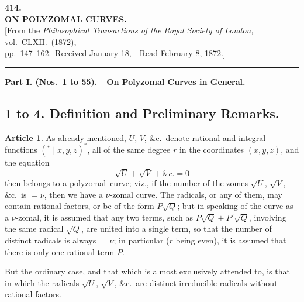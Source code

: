 \documentclass[11pt,a4paper]{article}
\theoremstyle{definition}
\newtheorem{art}{Article}
\newcommand{\polyzomal}{polyzomal}
\begin{document}
\thispagestyle{empty}
\begin{center}
{\Large\bfseries 414.}\\[1em]
{\LARGE\bfseries ON POLYZOMAL CURVES.}\\[2em]
{\normalsize [From the \textit{Philosophical Transactions of the Royal Society of London,} vol.\ CLXII.\ (1872),\\pp.~147--162.\ Received January 18,---Read February 8, 1872.]}\\[2em]
\rule{0.5\textwidth}{0.4pt}
\end{center}

\vspace{1em}

\begin{center}
\textbf{Part I. (Nos.\ 1 to 55).---On Polyzomal Curves in General.}
\end{center}

\vspace{0.5em}

\subsection*{1 to 4. Definition and Preliminary Remarks.}

\begin{art}
As already mentioned, $U$, $V$, \&c.\ denote rational and integral functions $({}^{*}\!\!\mid\! x, y, z)^{r}$, all of the same degree $r$ in the coordinates $(x, y, z)$, and the equation
\[
\sqrt{U} + \sqrt{V} + \&c. = 0
\]
then belongs to a \polyzomal\ curve; viz., if the number of the zomes $\sqrt{U}$, $\sqrt{V}$, \&c.\ is $= \nu$, then we have a $\nu$-zomal curve. The radicals, or any of them, may contain rational factors, or be of the form $P\sqrt{Q}$; but in speaking of the curve as a $\nu$-zomal, it is assumed that any two terms, such as $P\sqrt{Q} + P'\sqrt{Q}$, involving the same radical $\sqrt{Q}$, are united into a single term, so that the number of distinct radicals is always $= \nu$; in particular ($r$ being even), it is assumed that there is only one rational term $P$.

But the ordinary case, and that which is almost exclusively attended to, is that in which the radicals $\sqrt{U}$, $\sqrt{V}$, \&c.\ are distinct irreducible radicals without rational factors.
\end{art}
\end{document}

